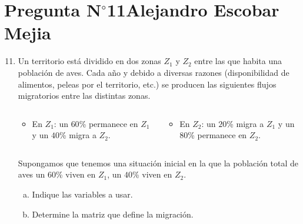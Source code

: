 \section{Pregunta N$^{\circ}$11\qquad Alejandro Escobar Mejia}

\begin{frame}
	\begin{enumerate}\setcounter{enumi}{10}
		\item

		      Un territorio está dividido en dos zonas $Z_{1}$ y
		      $Z_{2}$ entre las que habita una población de aves.
		      Cada año y debido a diversas razones (disponibilidad de
		      alimentos, peleas por el territorio, etc.) se producen
		      las siguientes flujos migratorios entre las distintas
		      zonas.

		      \begin{columns}
			      \begin{column}{0.48\textwidth}
				      \begin{itemize}
					      \item

					            En $Z_{1}$: un $60$\% permanece en $Z_{1}$
					            y un $40$\% migra a $Z_{2}$.
				      \end{itemize}
			      \end{column}
			      \begin{column}{0.48\textwidth}
				      \begin{itemize}
					      \item

					            En $Z_{2}$: un $20$\% migra a $Z_{1}$ y un
					            $80$\% permanece en $Z_{2}$.
				      \end{itemize}
			      \end{column}
		      \end{columns}

		      Supongamos que tenemos una situación inicial en la que la
		      población total de aves un $60$\% viven en $Z_{1}$, un
		      $40$\% viven en $Z_{2}$.

		      \begin{enumerate}[a)]
			      \item

			            Indique las variables a usar.

			      \item

			            Determine la matriz que define la migración.


\end{enumerate}
\end{enumerate}
\end{frame}
